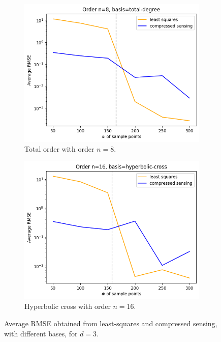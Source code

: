 \documentclass[12pt, oneside]{report}   	%
\begin{document}
\begin{figure}[t]
     \centering
     \begin{subfigure}[b]{0.45\textwidth}
         \centering
         \includegraphics[width=\textwidth]{img/GGd3TD8.png}
         \caption{Total order with order $n=8$.}
         \label{fig:convd3TD}
     \end{subfigure}
     \hfill
     \begin{subfigure}[b]{0.45\textwidth}
         \centering
         \includegraphics[width=\textwidth]{img/GGd3HC16.png}
         \caption{Hyperbolic cross with order $n=16$.}
         \label{fig:convd3HC}
     \end{subfigure}
        \caption{Average RMSE obtained from least-squares and compressed sensing, with different bases, for $d=3$.}
        \label{fig:convd3}
\end{figure}
\end{document}
